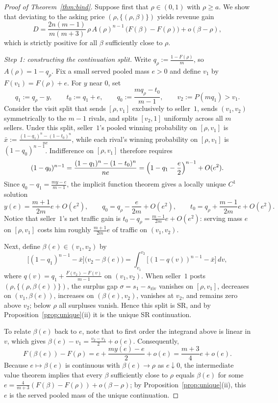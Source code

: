 \documentclass[12pt]{article}
\theoremstyle{mystyle}
\theoremstyle{mystyle2}
\newcommand{\1}{\mathbf{1}}
\begin{document}
\begin{proof}[Proof of Theorem~\ref{thm:bind}]
Suppose first that $\rho\in(0,1)$ with $\rho\ge a$. We show that deviating to the asking price $(\rho,\{(\rho,\beta)\})$ yields revenue gain
\begin{equation}\label{eq:askgain}
D = \frac{2n(m-1)}{m(m+3)}\,\rho\,A(\rho)^{n-1}\,\bigl(F(\beta)-F(\rho)\bigr) + o(\beta-\rho),
\end{equation}
which is strictly positive for all $\beta$ sufficiently close to $\rho$.

\emph{Step 1: constructing the continuation split.} Write $q_{\rho}:=\frac{1-F(\rho)}{m}$, so $A(\rho)=1-q_{\rho}$. Fix a small served pooled mass $e>0$ and define $v_1$ by $F(v_1)=F(\rho)+e$. For $y$ near $0$, set
\[
q_1 := q_{\rho}-y, \qquad t_0 := q_1+e, \qquad q_0 := \frac{m q_{\rho}-t_0}{m-1}, \qquad v_2 := P(mq_1) > v_1.
\]
Consider the visit split that sends $[\rho,v_1]$ exclusively to seller~$1$, sends $(v_1,v_2)$ symmetrically to the $m-1$ rivals, and splits $[v_2,1]$ uniformly across all $m$ sellers. Under this split, seller~$1$'s pooled winning probability on $[\rho,v_1]$ is $\bar x:=\frac{(1-q_1)^n-(1-t_0)^n}{ne}$, while each rival's winning probability on $[\rho,v_1]$ is $(1-q_0)^{n-1}$. Indifference on $[\rho,v_1]$ therefore requires
\[
(1-q_0)^{n-1} = \frac{(1-q_1)^n - (1-t_0)^n}{ne} = \Bigl(1-q_1-\frac{e}{2}\Bigr)^{n-1} + O(e^2).
\]
Since $q_0-q_1=\frac{my-e}{m-1}$, the implicit function theorem gives a locally unique $C^1$ solution
\[
y(e) = \frac{m+1}{2m}e + O(e^2), \qquad q_0 = q_{\rho} - \frac{e}{2m} + O(e^2), \qquad t_0 = q_{\rho} + \frac{m-1}{2m}e + O(e^2).
\]
Notice that seller~$1$'s net traffic gain is $t_0-q_{\rho}=\frac{m-1}{2m}e+O(e^2)$: serving mass $e$ on $[\rho,v_1]$ costs him roughly $\frac{m+1}{2m}e$ of traffic on $(v_1,v_2)$.

Next, define $\beta(e)\in(v_1,v_2)$ by
\[
\bigl[(1-q_1)^{n-1}-\bar x\bigr]\bigl(v_2-\beta(e)\bigr) = \int_{v_1}^{v_2}\bigl[(1-q(v))^{n-1}-\bar x\bigr]\,dv,
\]
where $q(v)=q_1+\frac{F(v_2)-F(v)}{m-1}$ on $(v_1,v_2)$. When seller~$1$ posts $(\rho,\{(\rho,\beta(e))\})$, the surplus gap $\sigma=s_1-s_{\mathrm{riv}}$ vanishes on $[\rho,v_1]$, decreases on $(v_1,\beta(e))$, increases on $(\beta(e),v_2)$, vanishes at $v_2$, and remains zero above $v_2$; below $\rho$ all surpluses vanish. Hence this split is SR, and by Proposition~\ref{prop:unique}(ii) it is the unique SR continuation.

To relate $\beta(e)$ back to $e$, note that to first order the integrand above is linear in $v$, which gives $\beta(e)-v_1=\frac{v_2-v_1}{2}+o(e)$. Consequently,
\[
F(\beta(e))-F(\rho) = e + \frac{my(e)-e}{2} + o(e) = \frac{m+3}{4}e + o(e).
\]
Because $e\mapsto\beta(e)$ is continuous with $\beta(e)\to\rho$ as $e\downarrow 0$, the intermediate value theorem implies that every $\beta$ sufficiently close to $\rho$ equals $\beta(e)$ for some $e=\frac{4}{m+3}(F(\beta)-F(\rho))+o(\beta-\rho)$; by Proposition~\ref{prop:unique}(ii), this $e$ is the served pooled mass of the unique continuation.


\end{proof}
\end{document}

